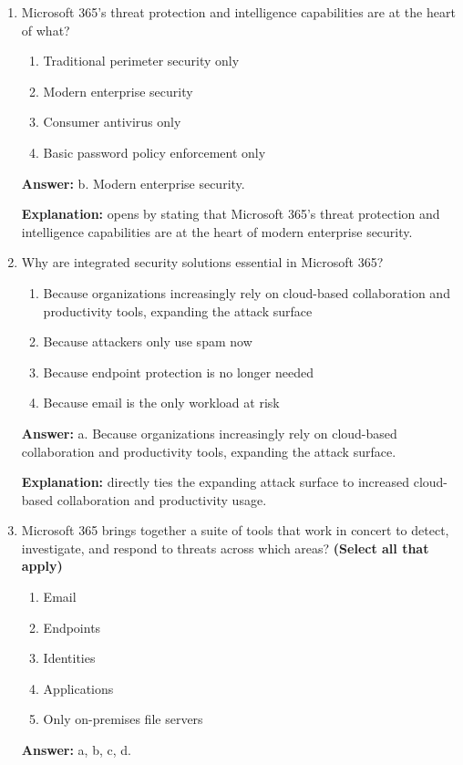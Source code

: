 \documentclass[10pt]{article}
\begin{document}
\begin{enumerate}[leftmargin=*]

\item Microsoft 365’s threat protection and intelligence capabilities are at the heart of what?
\begin{enumerate}[label=\alph*., leftmargin=1.5em]
\item Traditional perimeter security only
\item Modern enterprise security
\item Consumer antivirus only
\item Basic password policy enforcement only
\end{enumerate}
\textbf{Answer:} b. Modern enterprise security.

\textbf{Explanation:} opens by stating that Microsoft 365’s threat protection and intelligence capabilities are at the heart of modern enterprise security.

\item Why are integrated security solutions essential in Microsoft 365?
\begin{enumerate}[label=\alph*., leftmargin=1.5em]
\item Because organizations increasingly rely on cloud-based collaboration and productivity tools, expanding the attack surface
\item Because attackers only use spam now
\item Because endpoint protection is no longer needed
\item Because email is the only workload at risk
\end{enumerate}
\textbf{Answer:} a. Because organizations increasingly rely on cloud-based collaboration and productivity tools, expanding the attack surface.

\textbf{Explanation:} directly ties the expanding attack surface to increased cloud-based collaboration and productivity usage.

\item Microsoft 365 brings together a suite of tools that work in concert to detect, investigate, and respond to threats across which areas? \textbf{(Select all that apply)}
\begin{enumerate}[label=\alph*., leftmargin=1.5em]
\item Email
\item Endpoints
\item Identities
\item Applications
\item Only on-premises file servers
\end{enumerate}
\textbf{Answer:} a, b, c, d.


\end{enumerate}
\end{document}
